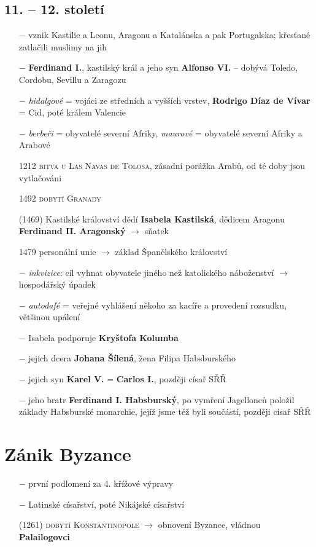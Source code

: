 \documentclass{article}
\begin{document}
\subsection*{11. -- 12. století}
\begin{itemize}
    \vspace{-0.5em}
    \setlength\itemsep{0.15em}
    \item[$-$] vznik Kastilie a Leonu, Aragonu a Katalánska a pak Portugalska; křesťané zatlačili muslimy na jih
    \item[$-$] \textbf{Ferdinand I.}, kastilský král a jeho syn \textbf{Alfonso VI.} -- dobývá Toledo, Cordobu, Sevillu a Zaragozu
    \item[$-$] \textit{hidalgové} = vojáci ze středních a vyšších vrstev, \textbf{Rodrigo Díaz de Vívar} = Cid, poté králem Valencie
    \item[$-$] \textit{berbeři} = obyvatelé severní Afriky, \textit{maurové} = obyvatelé severní Afriky a Arabové
    \item[1212] \textsc{bitva u Las Navas de Tolosa}, zásadní porážka Arabů, od té doby jsou vytlačováni
    \item[1492] \textsc{dobytí Granady}
    \item[(1469)] Kastilské království dědí \textbf{Isabela Kastilská}, dědicem Aragonu \textbf{Ferdinand II. Aragonský} $\rightarrow$ sňatek
    \item[1479] personální unie $\rightarrow$ základ Španělského království
    \item[$-$] \textit{inkvizice}: cíl vyhnat obyvatele jiného než katolického náboženství $\rightarrow$ hospodářský úpadek
    \item[$-$] \textit{autodafé} = veřejné vyhlášení někoho za kacíře a provedení rozsudku, většinou upálení
    \item[$-$] Isabela podporuje \textbf{Kryštofa Kolumba}
    \item[$-$] jejich dcera \textbf{Johana Šílená}, žena Filipa Habsburského
    \item[$-$] jejich syn \textbf{Karel V.} = \textbf{Carlos I.}, později císař SŘŘ
    \item[$-$] jeho bratr \textbf{Ferdinand I. Habsburský}, po vymření Jagellonců položil základy Habsburské monarchie, jejíž jsme též byli součástí, později císař SŘŘ
\end{itemize}

\section*{Zánik Byzance}
\begin{itemize}
    \vspace{-0.5em}
    \setlength\itemsep{0.15em}
    \item[$-$] první podlomení za 4. křížové výpravy
    \item[$-$] Latinské císařství, poté Nikájské císařství
    \item[(1261)] \textsc{dobytí Konstantinopole} $\rightarrow$ obnovení Byzance, vládnou \textbf{Palailogovci}
\end{itemize}
\end{document}
